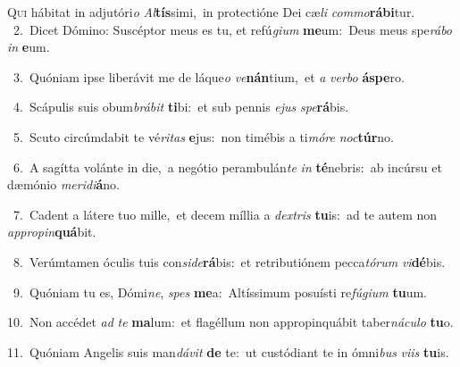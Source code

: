 \lettrine{\initial\textcolor{\initialcolor}{Q}}{ui} hábitat in adjutóri\textit{o} \textit{Al}\-\textbf{tís}simi,~\star in protectióne Dei cæ\textit{li} \textit{com}\-\textit{mo}\textbf{rá}\textbf{bi}tur.\\
{\numbfont\textcolor{\numbcolor}{~2.}}~Dicet Dómino: Suscéptor meus es tu, et refú\-\textit{gi}\-\textit{um} \textbf{me}\-um:~\star Deus meus spe\-\textit{rá}\-\textit{bo} \textit{in} \textbf{e}\-um.\par
{\numbfont\textcolor{\numbcolor}{~3.}}~Quóniam ipse liberávit me de láque\textit{o} \textit{ve}\-\textbf{nán}tium,~\star et \textit{a} \textit{ver}\-\textit{bo} \textbf{ás}\-\textbf{pe}ro.\par
{\numbfont\textcolor{\numbcolor}{~4.}}~Scápulis suis obum\-\textit{brá}\-\textit{bit} \textbf{ti}\-bi:~\star et sub pennis \textit{e}\-\textit{jus} \textit{spe}\-\textbf{rá}bis.\par
{\numbfont\textcolor{\numbcolor}{~5.}}~Scuto circúmdabit te vé\-\textit{ri}\-\textit{tas} \textbf{e}\-jus:~\star non timébis a ti\-\textit{mó}\-\textit{re} \textit{noc}\-\textbf{túr}no.\par
{\numbfont\textcolor{\numbcolor}{~6.}}~A sagítta volánte in die,~\dagger a negótio perambulán\textit{te} \textit{in} \textbf{té}\-nebris:~\star ab incúrsu et dæmónio \textit{me}\-\textit{ri}\textit{di}\textbf{á}no.\par
{\numbfont\textcolor{\numbcolor}{~7.}}~Cadent a látere tuo mille,~\dagger et decem míllia a \textit{dex}\-\textit{tris} \textbf{tu}\-is:~\star ad te autem non \textit{ap}\-\textit{pro}\textit{pin}\textbf{quá}bit.\par
{\numbfont\textcolor{\numbcolor}{~8.}}~Verúmtamen óculis tuis con\-\textit{si}\-\textit{de}\textbf{rá}bis:~\star et retributiónem pecca\-\textit{tó}\-\textit{rum} \textit{vi}\-\textbf{dé}bis.\par
{\numbfont\textcolor{\numbcolor}{~9.}}~Quóniam tu es, Dómi\-\textit{ne}\-, \textit{spes} \textbf{me}\-a:~\star Altíssimum posuísti re\-\textit{fú}\-\textit{gi}\textit{um} \textbf{tu}\-um.\par
{\numbfont\textcolor{\numbcolor}{10.}}~Non accédet \textit{ad} \textit{te} \textbf{ma}\-lum:~\star et flagéllum non appropinquábit taber\-\textit{ná}\-\textit{cu}\textit{lo} \textbf{tu}\-o.\par
{\numbfont\textcolor{\numbcolor}{11.}}~Quóniam Angelis suis man\-\textit{dá}\-\textit{vit} \textbf{de} te:~\star ut custódiant te in ómni\textit{bus} \textit{vi}\-\textit{is} \textbf{tu}\-is.\par
